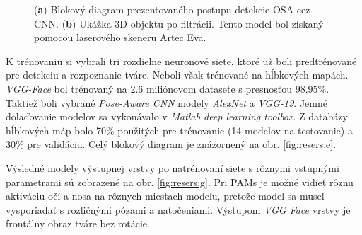 \begin{figure}[h]
\begin{subfigure}[b]{0.37\textwidth}
		\caption{}
		\label{fig:resers:f}
	\end{subfigure}
	\caption{(\textbf{a}) Blokový diagram prezentovaného postupu detekcie OSA cez CNN. 
	(\textbf{b}) Ukážka 3D objektu po filtrácii. Tento model bol získaný pomocou laserového skeneru Artec Eva.} 
\label{fig:resers:2}
\end{figure}

K trénovaniu si vybrali tri rozdielne neuronové siete, ktoré už boli predtrénované pre detekciu a rozpoznanie tváre. Neboli však trénované na hĺbkových mapách.  \textit{VGG-Face} bol trénovaný na 2.6 miliónovom datasete s presnosťou $ 98.95\% $. Taktiež boli vybrané \textit{Pose-Aware CNN} modely \textit{AlexNet} a \textit{VGG-19}. 
Jemné dolaďovanie modelov sa vykonávalo v \textit{Matlab deep learning toolbox}. Z databázy hĺbkových máp bolo 70\% použitých pre trénovanie (14 modelov na testovanie) a $ 30\% $ pre validáciu. Celý blokový diagram je znázornený na obr. \ref{fig:resers:e}. 

Výsledné modely výstupnej vrstvy po natrénovaní siete s rôznymi vstupnými parametrami sú zobrazené na obr. \ref{fig:resers:g}. Pri PAMs je možné vidieť rôznu aktiváciu očí a nosa na rôznych miestach modelu, pretože model sa musel vysporiadať s rozličnými pózami a natočeniami.  Výstupom \textit{VGG Face} vrstvy je frontálny obraz tváre bez rotácie.

